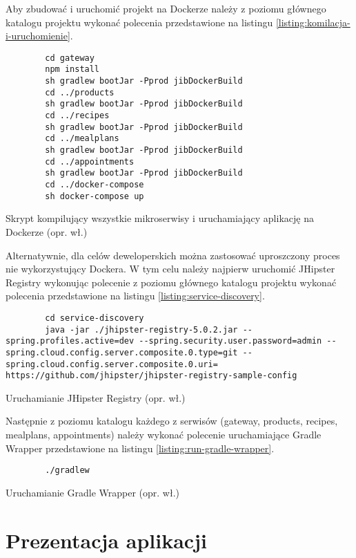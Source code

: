 Aby zbudować i uruchomić projekt na Dockerze należy z poziomu głównego katalogu projektu
wykonać polecenia przedstawione na listingu \ref{listing:komilacja-i-uruchomienie}.
\begin{listing}[h!]
    \begin{verbatim}
        cd gateway
        npm install
        sh gradlew bootJar -Pprod jibDockerBuild
        cd ../products
        sh gradlew bootJar -Pprod jibDockerBuild
        cd ../recipes
        sh gradlew bootJar -Pprod jibDockerBuild
        cd ../mealplans
        sh gradlew bootJar -Pprod jibDockerBuild
        cd ../appointments
        sh gradlew bootJar -Pprod jibDockerBuild
        cd ../docker-compose
        sh docker-compose up
    \end{verbatim}
    \caption{Skrypt kompilujący wszystkie mikroserwisy i uruchamiający aplikację na Dockerze (opr. wł.)} \label{listing:komilacja-i-uruchomienie}
\end{listing}

Alternatywnie, dla celów deweloperskich można zastosować uproszczony proces nie wykorzystujący Dockera.
W tym celu należy najpierw uruchomić JHipster Registry wykonując polecenie z poziomu głównego katalogu projektu
wykonać polecenia przedstawione na listingu \ref{listing:service-discovery}.
\begin{listing}[h!]
    \begin{verbatim}
        cd service-discovery
        java -jar ./jhipster-registry-5.0.2.jar --spring.profiles.active=dev --spring.security.user.password=admin --spring.cloud.config.server.composite.0.type=git --spring.cloud.config.server.composite.0.uri= https://github.com/jhipster/jhipster-registry-sample-config
    \end{verbatim}
    \caption{Uruchamianie JHipster Registry (opr. wł.)} \label{listing:service-discovery}
\end{listing}

Następnie z poziomu katalogu każdego z serwisów (gateway, products, recipes, mealplans, appointments)
należy wykonać polecenie uruchamiające Gradle Wrapper przedstawione na listingu \ref{listing:run-gradle-wrapper}.
\begin{listing}[h!]
    \begin{verbatim}
        ./gradlew
    \end{verbatim}
    \caption{Uruchamianie Gradle Wrapper (opr. wł.)} \label{listing:run-gradle-wrapper}
\end{listing}

\section{Prezentacja aplikacji}\label{sec:app-presentation}

